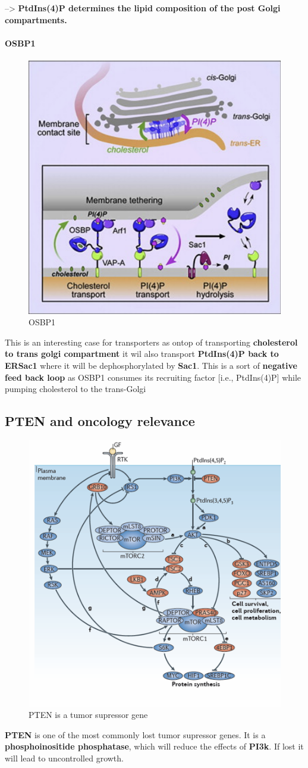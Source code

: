 \documentclass[../main.tex]{subfiles}
\begin{document}
-->  \textbf{PtdIns(4)P determines the lipid 
composition of the post Golgi compartments. }
\paragraph{OSBP1}
\begin{figure}[H]
    \centering
    \includegraphics[width=0.5\linewidth]{OSBP1.png}
    \caption{OSBP1}
    \label{fig:enter-label}
\end{figure}
This is an interesting case for transporters as ontop of transporting \textbf{cholesterol to trans golgi compartment} it wil also transport \textbf{PtdIns(4)P back to ERSac1} where it will be dephosphorylated by \textbf{\gls{Sac1}}. This is a sort of \textbf{negative feed back loop} as OSBP1  consumes its recruiting factor [i.e., PtdIns(4)P] while 
pumping cholesterol to the trans-Golgi



\subsection{PTEN and oncology relevance}
\begin{figure}[H]
    \centering
    \includegraphics[width=0.5\linewidth]{PTEN.png}
    \caption{PTEN is a tumor supressor gene}
    \label{fig:enter-label}
\end{figure}
\textbf{PTEN }is one of the most commonly lost tumor supressor genes. It is a \textbf{phosphoinositide phosphatase}, which will reduce the effects of \textbf{PI3k}. If lost it will lead to uncontrolled growth.
\end{document}
